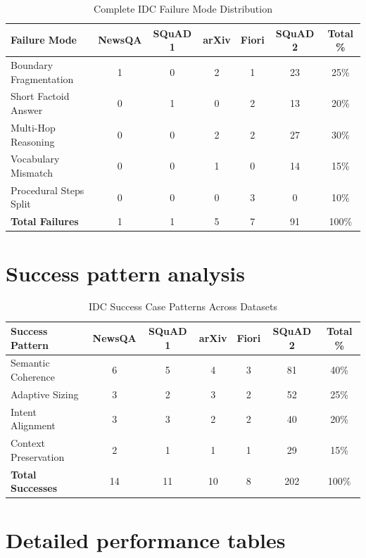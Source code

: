 \documentclass[12pt,a4paper]{report}
\begin{document}
\begin{table}[h!]
\centering
\caption{Complete IDC Failure Mode Distribution}
\label{tab:complete_failure_modes}
\begin{tabular}{lcccccc}
\hline
\textbf{Failure Mode} & \textbf{NewsQA} & \textbf{SQuAD 1} & \textbf{arXiv} & \textbf{Fiori} & \textbf{SQuAD 2} & \textbf{Total \%} \\
\hline
Boundary Fragmentation & 1 & 0 & 2 & 1 & 23 & 25\% \\
Short Factoid Answer & 0 & 1 & 0 & 2 & 13 & 20\% \\
Multi-Hop Reasoning & 0 & 0 & 2 & 2 & 27 & 30\% \\
Vocabulary Mismatch & 0 & 0 & 1 & 0 & 14 & 15\% \\
Procedural Steps Split & 0 & 0 & 0 & 3 & 0 & 10\% \\
\hline
\textbf{Total Failures} & 1 & 1 & 5 & 7 & 91 & 100\% \\
\hline
\end{tabular}
\end{table}

\section{Success pattern analysis}

\begin{table}[h!]
\centering
\caption{IDC Success Case Patterns Across Datasets}
\label{tab:success_patterns}
\begin{tabular}{lcccccc}
\hline
\textbf{Success Pattern} & \textbf{NewsQA} & \textbf{SQuAD 1} & \textbf{arXiv} & \textbf{Fiori} & \textbf{SQuAD 2} & \textbf{Total \%} \\
\hline
Semantic Coherence & 6 & 5 & 4 & 3 & 81 & 40\% \\
Adaptive Sizing & 3 & 2 & 3 & 2 & 52 & 25\% \\
Intent Alignment & 3 & 3 & 2 & 2 & 40 & 20\% \\
Context Preservation & 2 & 1 & 1 & 1 & 29 & 15\% \\
\hline
\textbf{Total Successes} & 14 & 11 & 10 & 8 & 202 & 100\% \\
\hline
\end{tabular}
\end{table}

\section{Detailed performance tables}
\end{document}
